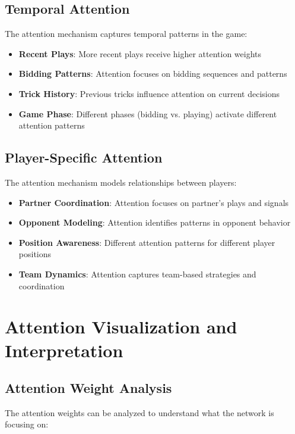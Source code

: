 \documentclass[conference]{IEEEtran}
\begin{document}
\subsection{Temporal Attention}

The attention mechanism captures temporal patterns in the game:

\begin{itemize}
    \item \textbf{Recent Plays}: More recent plays receive higher attention weights
    \item \textbf{Bidding Patterns}: Attention focuses on bidding sequences and patterns
    \item \textbf{Trick History}: Previous tricks influence attention on current decisions
    \item \textbf{Game Phase}: Different phases (bidding vs. playing) activate different attention patterns
\end{itemize}

\subsection{Player-Specific Attention}

The attention mechanism models relationships between players:

\begin{itemize}
    \item \textbf{Partner Coordination}: Attention focuses on partner's plays and signals
    \item \textbf{Opponent Modeling}: Attention identifies patterns in opponent behavior
    \item \textbf{Position Awareness}: Different attention patterns for different player positions
    \item \textbf{Team Dynamics}: Attention captures team-based strategies and coordination
\end{itemize}

\section{Attention Visualization and Interpretation}

\subsection{Attention Weight Analysis}

The attention weights can be analyzed to understand what the network is focusing on:
\end{document}
